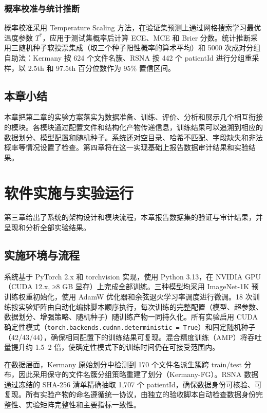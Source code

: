 \documentclass[12pt,a4paper,UTF8,openany]{ctexbook}
\begin{document}
\subsection{概率校准与统计推断}

概率校准采用 Temperature Scaling 方法，在验证集预测上通过网格搜索学习最优温度参数 $T^*$，应用于测试集概率后计算 ECE、MCE 和 Brier 分数。统计推断采用三随机种子软投票集成（取三个种子阳性概率的算术平均）和 5000 次成对分组自助法：Kermany 按 624 个文件名簇、RSNA 按 442 个 patientId 进行分组重采样，以 2.5th 和 97.5th 百分位数作为 95\% 置信区间。

\section{本章小结}

本章把第二章的实验方案落实为数据准备、训练、评价、分析和展示几个相互衔接的模块。各模块通过配置文件和结构化产物传递信息，训练结果可以追溯到相应的数据划分、模型配置和随机种子。系统还对空目录、哈希不匹配、字段缺失和非法概率等情况设置了检查。第四章将在这一实现基础上报告数据审计结果和实验结果。

\chapter{软件实施与实验运行}

第三章给出了系统的架构设计和模块流程，本章报告数据集的验证与审计结果，并呈现和分析全部实验结果。

\section{实施环境与流程}

系统基于 PyTorch 2.x 和 torchvision 实现，使用 Python 3.13，在 NVIDIA GPU（CUDA 12.x, ≥8 GB 显存）上完成全部训练。三种模型均采用 ImageNet-1K 预训练权重初始化，使用 AdamW 优化器和余弦退火学习率调度进行微调。18 次训练按实验矩阵由自动化编排脚本顺序执行，每次训练的完整配置（模型、超参数、数据划分、增强策略、随机种子）随训练产物一同持久化。所有实验启用 CUDA 确定性模式（\texttt{torch.backends.cudnn.deterministic = True}）和固定随机种子（42/43/44），确保相同配置下的训练结果可复现。混合精度训练（AMP）将吞吐量提升约 1.5--2 倍，使确定性模式下的训练时间仍在可接受范围内。

在数据层面，Kermany 原始划分中检测到 170 个文件名派生簇跨 train/test 分布，因此采用保守的文件名簇分组策略重建了划分（Kermany-FG）。RSNA 数据通过冻结的 SHA-256 清单精确抽取 1,707 个 patientId，确保数据身份可核验、可复现。所有实验产物的命名遵循统一协议，由独立的验收脚本自动检查数据身份完整性、实验矩阵完整性和主要指标一致性。
\end{document}
